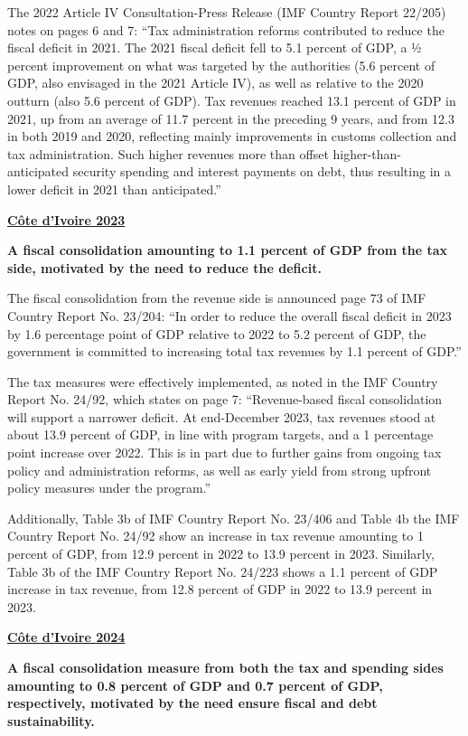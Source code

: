 The 2022 Article IV Consultation-Press Release (IMF Country Report 22/205) notes on pages 6 and 7: “Tax administration reforms contributed to reduce the fiscal deficit in 2021. The 2021 fiscal deficit fell to 5.1 percent of GDP, a ½ percent improvement on what was targeted by the authorities (5.6 percent of GDP, also envisaged in the 2021 Article IV), as well as relative to the 2020 outturn (also 5.6 percent of GDP). Tax revenues reached 13.1 percent of GDP in 2021, up from an average of 11.7 percent in the preceding 9 years, and from 12.3 in both 2019 and 2020, reflecting mainly improvements in customs collection and tax administration. Such higher revenues more than offset higher-than-anticipated security spending and interest payments on debt, thus resulting in a lower deficit in 2021 than anticipated.”

\textbf{\underline{Côte d'Ivoire 2023}}

\textbf{A fiscal consolidation amounting to 1.1 percent of GDP from the tax side, motivated by the need to reduce the deficit.} 

The fiscal consolidation from the revenue side is announced page 73 of IMF Country Report No. 23/204: “In order to reduce the overall fiscal deficit in 2023 by 1.6 percentage point of GDP relative to 2022 to 5.2 percent of GDP, the government is committed to increasing total tax revenues by 1.1 percent of GDP.”

The tax measures were effectively implemented, as noted in the IMF Country Report No. 24/92, which states on page 7: “Revenue-based fiscal consolidation will support a narrower deficit. At end-December 2023, tax revenues stood at about 13.9 percent of GDP, in line with program targets, and a 1 percentage point increase over 2022. This is in part due to further gains from ongoing tax policy and administration reforms, as well as early yield from strong upfront policy measures under the program.”

Additionally, Table 3b of IMF Country Report No. 23/406 and Table 4b the IMF Country Report No. 24/92 show an increase in tax revenue amounting to 1 percent of GDP, from 12.9 percent in 2022 to 13.9 percent in 2023. Similarly, Table 3b of the IMF Country Report No. 24/223 shows a 1.1 percent of GDP increase in tax revenue, from 12.8 percent of GDP in 2022 to 13.9 percent in 2023.

\textbf{\underline{Côte d'Ivoire 2024}}

\textbf{A fiscal consolidation measure from both the tax and spending sides amounting to 0.8 percent of GDP and 0.7 percent of GDP, respectively, motivated by the need ensure fiscal and debt sustainability.} 

